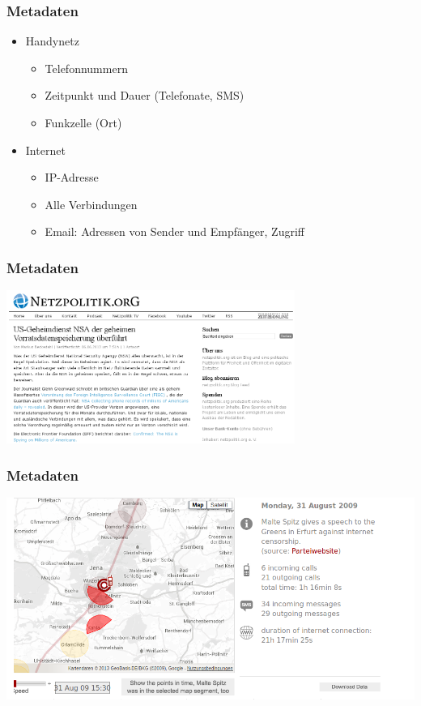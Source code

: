 \documentclass[12pt]{beamer}
\begin{document}
\begin{frame}
  \frametitle{Metadaten}
  \begin{itemize}
    \item<2-> Handynetz
      \begin{itemize}
        \item<3-> Telefonnummern
        \item<4-> Zeitpunkt und Dauer (Telefonate, SMS)
        \item<5-> Funkzelle (Ort)
      \end{itemize}
    \item<6->Internet
      \begin{itemize}
        \item<7-> IP-Adresse
        \item<8-> Alle Verbindungen
        \item<9-> Email: Adressen von Sender und Empfänger, Zugriff
      \end{itemize}
  \end{itemize}
\end{frame}

\begin{frame}
  \frametitle{Metadaten}
    \begin{center}
      \includegraphics[height=5cm]{img/netzpolitik-verizon.png}
    \end{center}
\end{frame}

\begin{frame}
    \frametitle{Metadaten}
    \includegraphics[height=0.7\textheight]{img/maltespitz.png}
\end{frame}
\end{document}
